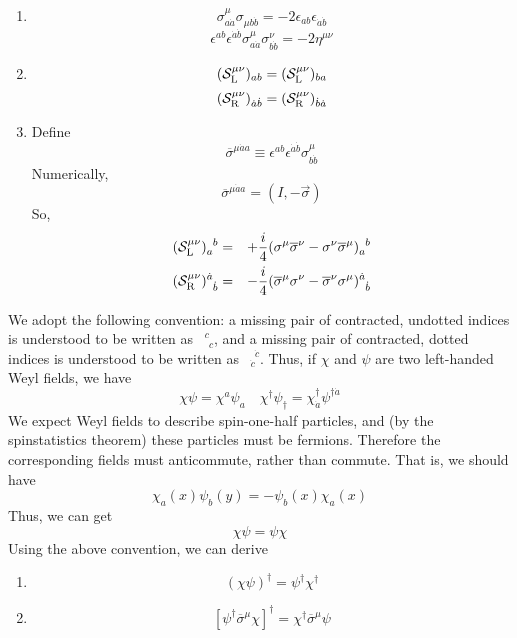 \begin{newprop}
\begin{enumerate}
\item 
\[\sigma^{\mu}_{a\dot{a}} \sigma_{\mu b\dot{b}} = -2\epsilon_{ab} \epsilon_{\dot{a}\dot{b}}\]
\[\epsilon^{ab}\epsilon^{\dot{a}\dot{b}} \sigma^{\mu}_{a\dot{a}} \sigma^{\nu}_{b\dot{b}} = -2\eta^{\mu\nu}\]
\item \[(\mathcal{S}_{\rm L}^{\mu\nu})_{ab} = (\mathcal{S}_{\rm L}^{\mu\nu})_{ba}\]
\[(\mathcal{S}_{\rm R}^{\mu\nu})_{\dot{a}\dot{b}} = (\mathcal{S}_{\rm R}^{\mu\nu})_{\dot{b}\dot{a}}\]
\item Define
\[\overline{\sigma}^{\mu \dot{a} a} \equiv \epsilon^{ab} \epsilon^{\dot{a}\dot{b}} \sigma^{\mu}_{b\dot{b}}\]
Numerically,
\[\overline{\sigma}^{\mu \dot{a} a} = (I , -\vec{\sigma})\]
So,
\begin{eqnarray}
(\mathcal{S}_{\rm L}^{\mu\nu})_a^{\phantom{a}b} &=& + \frac{i}{4} (\sigma^{\mu} \overline{\sigma}^{\nu} - \sigma^{\nu} \overline{\sigma}^{\mu})_a^{\phantom{a}b} \nonumber \\
(\mathcal{S}_{\rm R}^{\mu\nu})^{\dot{a}}_{\phantom{\dot{a}} \dot{b}} &=& - \frac{i}{4}(\overline{\sigma}^{\mu}\sigma^{\nu} - \overline{\sigma}^{\nu} \sigma^{\mu})^{\dot{a}}_{\phantom{\dot{a}} \dot{b}} \nonumber
\end{eqnarray}
\end{enumerate}
\end{newprop}

\noindent
We adopt the following convention: a missing pair of contracted,
undotted indices is understood to be written as $\phantom{1}^c_{\phantom{c}c}$, and a missing pair of
contracted, dotted indices is understood to be written as $\phantom{1}_{\dot{c}}^{\phantom{c}\dot{c}}$. Thus, if $\chi$ and
$\psi$ are two left-handed Weyl fields, we have
\[\chi \psi = \chi^{a}\psi_{a} \quad \chi^{\dagger} \psi_{\dagger} = \chi^{\dagger}_{\dot{a}} \psi^{\dagger \dot{a}}\]
We expect Weyl fields to describe spin-one-half particles, and (by the spinstatistics theorem) these particles must be fermions. Therefore the corresponding fields must anticommute, rather than commute. That is, we should have
\[\chi_a(x) \psi_b(y) = - \psi_b(x) \chi_a(x)\]
Thus, we can get
\[\chi\psi = \psi\chi\]
Using the above convention, we can derive

\begin{newprop}
\begin{enumerate}
\item \[(\chi\psi)^{\dagger} = \psi^{\dagger}\chi^{\dagger}\]
\item \[[\psi^{\dagger} \overline{\sigma}^{\mu} \chi]^{\dagger} = \chi^{\dagger} \overline{\sigma}^{\mu} \psi\]
\end{enumerate}
\end{newprop}


